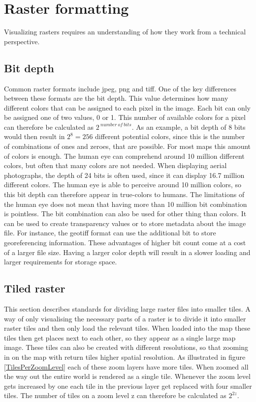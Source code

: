 \chapter{Raster formatting}\label{CRasterFormatting}

Visualizing rasters requires an understanding of how they work from a technical perspective.

\section{Bit depth} \label{BitDepth}
Common raster formats include jpeg, png and tiff. One of the key differences between these formats are the bit depth. This value determines how many different colors that can be assigned to each pixel in the image. Each bit can only be assigned one of two values, 0 or 1. This number of available colors for a pixel can therefore be calculated as $2^{\:number\: of\: bits}$. As an example, a bit depth of 8 bits would then result in $2^8 = 256$ different potential colors, since this is the number of combinations of ones and zeroes, that are possible. For most maps this amount of colors is enough. The human eye can comprehend around 10 million different colors, but often that many colors are not needed. When displaying aerial photographs, the depth of 24 bits is often used, since it can display 16.7 million different colors. The human eye is able to perceive around 10 million colors, so this bit depth can therefore appear in true-colors to humans.
The limitations of the human eye does not mean that having more than 10 million bit combination is pointless. The bit combination can also be used for other thing than colors. It can be used to create transparency values or to store metadata about the image file. For instance, the geotiff format can use the additional bit to store georeferencing information.
These advantages of higher bit count come at a cost of a larger file size. Having a larger color depth will result in a slower loading and larger requirements for storage space. \citep{Dent} %

\section{Tiled raster}\label{TiledRaster}
This section describes standards for dividing large raster files into smaller tiles. 
A way of only visualising the necessary parts of a raster is to divide it into smaller raster tiles and then only load the relevant tiles. When loaded into the map these tiles then get places next to each other, so they appear as a single large map image. These tiles can also be created with different resolutions, so that zooming in on the map with return tiles higher spatial resolution.  As illustrated in figure \ref{TilesPerZoomLevel} each of these zoom layers have more tiles.
\citep{Liedman}
When zoomed all the way out the entire world is rendered as a single tile. Whenever the zoom level gets increased by one each tile in the previous layer get replaced with four smaller tiles. The number of tiles on a zoom level z can therefore be calculated as $2^{2z}$.
\citep{SlippyMap}

